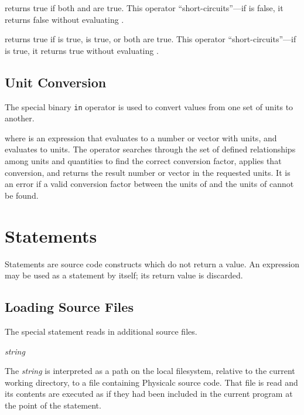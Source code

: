 \begin{syntax}
  
\end{syntax}
returns true if both  and  are true.  This operator
``short-circuits''---if  is false, it returns false without
evaluating .

\begin{syntax}
  
\end{syntax}
returns true if  is true,  is true, or both are true.
This operator ``short-circuits''---if  is true, it returns
true without evaluating .



\subsection{Unit Conversion}
\label{in-op}

The special binary \verb|in| operator is used to convert values from
one set of units to another.  

\begin{syntax}
  
\end{syntax}
where  is an expression that evaluates to a number or vector
with units, and  evaluates to units.  The  operator
searches through the set of defined relationships among units and
quantities to find the correct conversion factor, applies that
conversion, and returns the result number or vector in the requested
units.  It is an error if a valid conversion factor between the units
of  and the units of  cannot be found.





\section{Statements}
\label{statements}

Statements are source code constructs which do not return a value.  An
expression may be used as a statement by itself; its return value is
discarded.


\subsection{Loading Source Files}

The special  statement reads in additional source files.
\begin{syntax}
 \textit{string}
\end{syntax}
The \textit{string} is interpreted as a path on the local filesystem,
relative to the current working directory, to a file containing
Physicalc source code.  That file is read and its contents are
executed as if they had been included in the current program at the
point of the  statement.  

